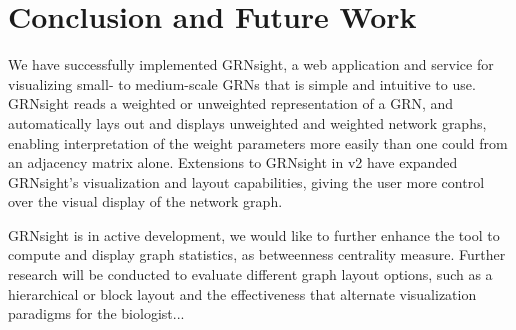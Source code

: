\documentclass[sigconf,review]{acmart}
\begin{document}
\section{Conclusion and Future Work}
We have successfully implemented GRNsight, a web application and service for visualizing small- to 
medium-scale GRNs that is simple and intuitive to use. GRNsight reads a weighted or unweighted 
representation of a GRN, and automatically lays out and displays unweighted and weighted network graphs, 
enabling interpretation of the weight parameters more easily than one could from an adjacency matrix 
alone. Extensions to GRNsight in v2 have expanded GRNsight's visualization and layout capabilities, 
giving the user more control over the visual display of the network graph.

GRNsight is in active development, we would like to further enhance the tool to compute and display 
graph statistics, as betweenness centrality measure. Further research will be conducted to evaluate 
different graph layout options, such as a hierarchical or block layout and the effectiveness that 
alternate visualization paradigms for the biologist...


 
\end{document}
